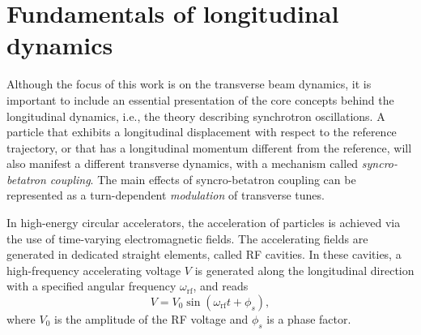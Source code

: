 
\section{Fundamentals of longitudinal dynamics} \label{sec:acc:longitudinal_dynamics}

Although the focus of this work is on the transverse beam dynamics, it is important to include an essential presentation of the core concepts behind the longitudinal dynamics, i.e., the theory describing synchrotron oscillations. A particle that exhibits a longitudinal displacement with respect to the reference trajectory, or that has a longitudinal momentum different from the reference, will also manifest a different transverse dynamics, with a mechanism called \textit{syncro-betatron coupling}. The main effects of syncro-betatron coupling can be represented as a turn-dependent \textit{modulation} of transverse tunes.

In high-energy circular accelerators, the acceleration of particles is achieved via the use of time-varying electromagnetic fields. The accelerating fields are generated in dedicated straight elements, called RF cavities. In these cavities, a high-frequency accelerating voltage $V$ is generated along the longitudinal direction with a specified angular frequency $\omega_{\mathrm{rf}}$, and reads
\begin{equation}
    V=V_0 \sin \left(\omega_{\mathrm{rf}} t+\phi_s\right),
\end{equation}
where $V_0$ is the amplitude of the RF voltage and $\phi_s$ is a phase factor.

